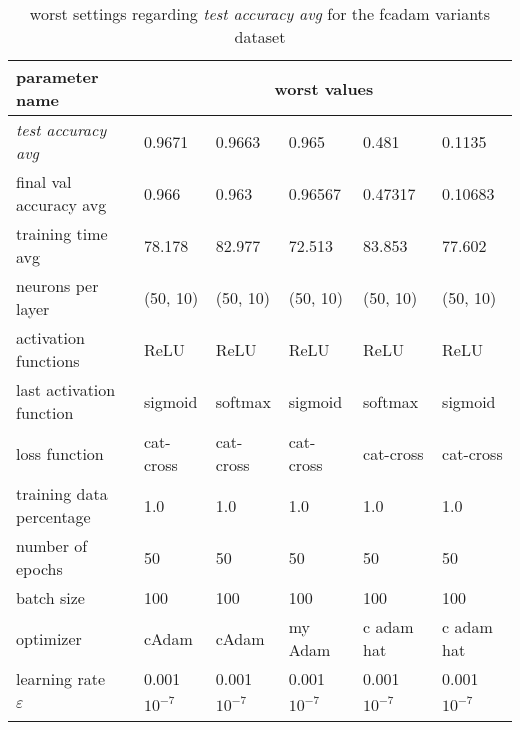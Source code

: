 \begin{longtable}{|l|l|l|l|l|>{\columncolor{worstColumnColor}}l|}
\hline
\textbf{parameter name} & \multicolumn{5}{c|}{\textbf{worst values}} \\
\hline
\textit{test accuracy avg} &  0.9671 &  0.9663 &   0.965 &   0.481 &  0.1135 \\
final val accuracy avg   & 0.966   & 0.963   & 0.96567 & 0.47317 & 0.10683 \\
training time avg        & 78.178  & 82.977  & 72.513  & 83.853  & 77.602  \\
{\color{equalParamColor} neurons per layer } & {\color{equalParamColor} (50, 10) } & {\color{equalParamColor} (50, 10) } & {\color{equalParamColor} (50, 10) } & {\color{equalParamColor} (50, 10) } & {\color{equalParamColor} (50, 10) } \\
{\color{equalParamColor} activation functions } & {\color{equalParamColor} ReLU } & {\color{equalParamColor} ReLU } & {\color{equalParamColor} ReLU } & {\color{equalParamColor} ReLU } & {\color{equalParamColor} ReLU } \\
last activation function & sigmoid & softmax & sigmoid & softmax & sigmoid \\
{\color{equalParamColor} loss function } & {\color{equalParamColor} cat-cross } & {\color{equalParamColor} cat-cross } & {\color{equalParamColor} cat-cross } & {\color{equalParamColor} cat-cross } & {\color{equalParamColor} cat-cross } \\
{\color{equalParamColor} training data percentage } & {\color{equalParamColor} 1.0 } & {\color{equalParamColor} 1.0 } & {\color{equalParamColor} 1.0 } & {\color{equalParamColor} 1.0 } & {\color{equalParamColor} 1.0 } \\
{\color{equalParamColor} number of epochs } & {\color{equalParamColor} 50 } & {\color{equalParamColor} 50 } & {\color{equalParamColor} 50 } & {\color{equalParamColor} 50 } & {\color{equalParamColor} 50 } \\
{\color{equalParamColor} batch size } & {\color{equalParamColor} 100 } & {\color{equalParamColor} 100 } & {\color{equalParamColor} 100 } & {\color{equalParamColor} 100 } & {\color{equalParamColor} 100 } \\
optimizer                & cAdam   & cAdam   & my Adam & c adam hat & c adam hat \\
{\color{equalParamColor} learning rate } & {\color{equalParamColor} 0.001 } & {\color{equalParamColor} 0.001 } & {\color{equalParamColor} 0.001 } & {\color{equalParamColor} 0.001 } & {\color{equalParamColor} 0.001 } \\
{\color{equalParamColor} $\varepsilon$ } & {\color{equalParamColor} $10^{-7}$ } & {\color{equalParamColor} $10^{-7}$ } & {\color{equalParamColor} $10^{-7}$ } & {\color{equalParamColor} $10^{-7}$ } & {\color{equalParamColor} $10^{-7}$ } \\
\hline

\caption{worst settings regarding \textit{test accuracy avg} for the fcadam variants dataset}
\label{table:variant_test_accuracy_avg_worst_fcadam_variants}
\end{longtable}
